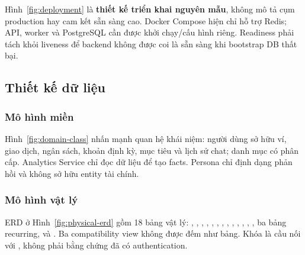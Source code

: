 
Hình~\ref{fig:deployment} là \textbf{thiết kế triển khai nguyên mẫu}, không mô tả cụm production hay cam kết sẵn sàng cao. Docker Compose hiện chỉ hỗ trợ Redis; API, worker và PostgreSQL cần được khởi chạy/cấu hình riêng. Readiness phải tách khỏi liveness để backend không được coi là sẵn sàng khi bootstrap DB thất bại.

\subsection{Thiết kế dữ liệu}

\subsubsection{Mô hình miền}


Hình~\ref{fig:domain-class} nhấn mạnh quan hệ khái niệm: người dùng sở hữu ví, giao dịch, ngân sách, khoản định kỳ, mục tiêu và lịch sử chat; danh mục có phân cấp. Analytics Service chỉ đọc dữ liệu để tạo facts. Persona chỉ định dạng phản hồi và không sở hữu entity tài chính.

\subsubsection{Mô hình vật lý}


ERD ở Hình~\ref{fig:physical-erd} gồm 18 bảng vật lý: , , , , , , , , , , , , , ba bảng recurring,  và . Ba compatibility view không được đếm như bảng. Khóa  là cầu nối với , không phải bằng chứng đã có authentication.

